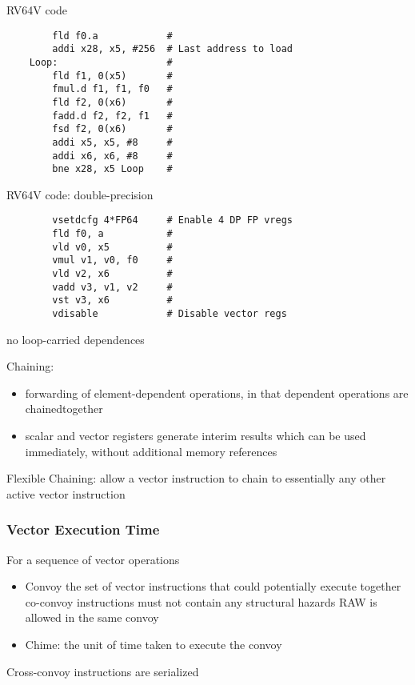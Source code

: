 \begin{code}
    \caption{RV64V code}
    \begin{verbatim}
        fld f0.a            #
        addi x28, x5, #256  # Last address to load
    Loop:                   #
        fld f1, 0(x5)       # 
        fmul.d f1, f1, f0   # 
        fld f2, 0(x6)       # 
        fadd.d f2, f2, f1   # 
        fsd f2, 0(x6)       # 
        addi x5, x5, #8     # 
        addi x6, x6, #8     # 
        bne x28, x5 Loop    # 
    \end{verbatim}
\end{code}

\begin{code}
    \caption{RV64V code: double-precision}
    \begin{verbatim}
        vsetdcfg 4*FP64     # Enable 4 DP FP vregs
        fld f0, a           # 
        vld v0, x5          # 
        vmul v1, v0, f0     # 
        vld v2, x6          # 
        vadd v3, v1, v2     # 
        vst v3, x6          # 
        vdisable            # Disable vector regs
    \end{verbatim}
\end{code}
no loop-carried dependences

Chaining: 
\begin{itemize}
    \item forwarding of element-dependent operations, in that dependent operations are chainedtogether
    \item scalar and vector registers
    generate interim results which can be
    used immediately, without additional
    memory references
\end{itemize}
Flexible Chaining: allow a vector
instruction to chain to essentially any
other active vector instruction

\subsubsection{Vector Execution Time}
For a sequence of vector operations
\begin{itemize}
    \item Convoy
    \subitem the set of vector instructions that could
    potentially execute together
    \subitem co-convoy instructions must not contain
    any structural hazards
    \subitem RAW is allowed in the same convoy
    \item Chime: 
    \subitem the unit of time taken to execute the
    convoy
\end{itemize}
Cross-convoy instructions are serialized

